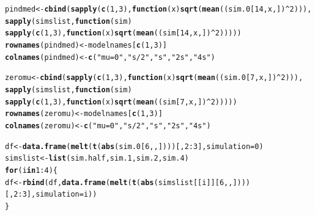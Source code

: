 \documentclass[AMA,STIX1COL]{WileyNJD-v2}\usepackage[]{graphicx}\usepackage[]{color}
\makeatletter
\newcommand{\hlnum}[1]{\textcolor[rgb]{0.686,0.059,0.569}{#1}}%
\newcommand{\hlstr}[1]{\textcolor[rgb]{0.192,0.494,0.8}{#1}}%
\newcommand{\hlopt}[1]{\textcolor[rgb]{0,0,0}{#1}}%
\newcommand{\hlstd}[1]{\textcolor[rgb]{0.345,0.345,0.345}{#1}}%
\newcommand{\hlkwa}[1]{\textcolor[rgb]{0.161,0.373,0.58}{\textbf{#1}}}%
\newcommand{\hlkwb}[1]{\textcolor[rgb]{0.69,0.353,0.396}{#1}}%
\newcommand{\hlkwc}[1]{\textcolor[rgb]{0.333,0.667,0.333}{#1}}%
\newcommand{\hlkwd}[1]{\textcolor[rgb]{0.737,0.353,0.396}{\textbf{#1}}}%
\newenvironment{kframe}{%
 \def\at@end@of@kframe{}%
 \ifinner\ifhmode%
  \def\at@end@of@kframe{\end{minipage}}%
  \begin{minipage}{\columnwidth}%
 \fi\fi%
 \def\FrameCommand##1{\hskip\@totalleftmargin \hskip-\fboxsep
 \colorbox{shadecolor}{##1}\hskip-\fboxsep
     \hskip-\linewidth \hskip-\@totalleftmargin \hskip\columnwidth}%
 \MakeFramed {\advance\hsize-\width
   \@totalleftmargin\z@ \linewidth\hsize
   \@setminipage}}%
 {\par\unskip\endMakeFramed%
 \at@end@of@kframe}
\newenvironment{knitrout}{}{} %
\makeatother
\begin{document}
\begin{knitrout}
\begin{kframe}
\begin{alltt}
\hlstd{pindmed}\hlkwb{<-} \hlkwd{cbind}\hlstd{(}\hlkwd{sapply}\hlstd{(}\hlkwd{c}\hlstd{(}\hlnum{1}\hlstd{,}\hlnum{3}\hlstd{),} \hlkwa{function}\hlstd{(}\hlkwc{x}\hlstd{)} \hlkwd{sqrt}\hlstd{(}\hlkwd{mean}\hlstd{((sim.0[}\hlnum{14}\hlstd{,x,])}\hlopt{^}\hlnum{2}\hlstd{))),}
                \hlkwd{sapply}\hlstd{(simslist,} \hlkwa{function}\hlstd{(}\hlkwc{sim}\hlstd{)}
                  \hlkwd{sapply}\hlstd{(}\hlkwd{c}\hlstd{(}\hlnum{1}\hlstd{,}\hlnum{3}\hlstd{),} \hlkwa{function}\hlstd{(}\hlkwc{x}\hlstd{)} \hlkwd{sqrt}\hlstd{(}\hlkwd{mean}\hlstd{((sim[}\hlnum{14}\hlstd{,x,])}\hlopt{^}\hlnum{2}\hlstd{)))))}
\hlkwd{rownames}\hlstd{(pindmed)}\hlkwb{<-}\hlstd{modelnames[}\hlkwd{c}\hlstd{(}\hlnum{1}\hlstd{,}\hlnum{3}\hlstd{)]}
\hlkwd{colnames}\hlstd{(pindmed)}\hlkwb{<-}\hlkwd{c}\hlstd{(}\hlstr{"mu=0"}\hlstd{,}\hlstr{"s/2"}\hlstd{,} \hlstr{"s"}\hlstd{,} \hlstr{"2s"}\hlstd{,} \hlstr{"4s"}\hlstd{)}

\hlstd{zeromu}\hlkwb{<-} \hlkwd{cbind}\hlstd{(}\hlkwd{sapply}\hlstd{(}\hlkwd{c}\hlstd{(}\hlnum{1}\hlstd{,}\hlnum{3}\hlstd{),} \hlkwa{function}\hlstd{(}\hlkwc{x}\hlstd{)} \hlkwd{sqrt}\hlstd{(}\hlkwd{mean}\hlstd{((sim.0[}\hlnum{7}\hlstd{,x,])}\hlopt{^}\hlnum{2}\hlstd{))),}
               \hlkwd{sapply}\hlstd{(simslist,} \hlkwa{function}\hlstd{(}\hlkwc{sim}\hlstd{)}
                 \hlkwd{sapply}\hlstd{(}\hlkwd{c}\hlstd{(}\hlnum{1}\hlstd{,}\hlnum{3}\hlstd{),} \hlkwa{function}\hlstd{(}\hlkwc{x}\hlstd{)} \hlkwd{sqrt}\hlstd{(}\hlkwd{mean}\hlstd{((sim[}\hlnum{7}\hlstd{,x,])}\hlopt{^}\hlnum{2}\hlstd{)))))}
\hlkwd{rownames}\hlstd{(zeromu)}\hlkwb{<-}\hlstd{modelnames[}\hlkwd{c}\hlstd{(}\hlnum{1}\hlstd{,}\hlnum{3}\hlstd{)]}
\hlkwd{colnames}\hlstd{(zeromu)}\hlkwb{<-}\hlkwd{c}\hlstd{(}\hlstr{"mu=0"}\hlstd{,}\hlstr{"s/2"}\hlstd{,} \hlstr{"s"}\hlstd{,} \hlstr{"2s"}\hlstd{,} \hlstr{"4s"}\hlstd{)}


\hlstd{df}\hlkwb{<-} \hlkwd{data.frame}\hlstd{(}\hlkwd{melt}\hlstd{(}\hlkwd{t}\hlstd{(}\hlkwd{abs}\hlstd{(sim.0[}\hlnum{6}\hlstd{,,])))[,}\hlnum{2}\hlopt{:}\hlnum{3}\hlstd{],} \hlkwc{simulation}\hlstd{=}\hlnum{0}\hlstd{)}
\hlstd{simslist}\hlkwb{<-}\hlkwd{list}\hlstd{(sim.half,sim.1,sim.2,sim.4)}
\hlkwa{for} \hlstd{(i} \hlkwa{in} \hlnum{1}\hlopt{:}\hlnum{4}\hlstd{)\{}
  \hlstd{df}\hlkwb{<-}\hlkwd{rbind}\hlstd{(df,}\hlkwd{data.frame}\hlstd{(}\hlkwd{melt}\hlstd{(}\hlkwd{t}\hlstd{(}\hlkwd{abs}\hlstd{(simslist[[i]][}\hlnum{6}\hlstd{,,])))[,}\hlnum{2}\hlopt{:}\hlnum{3}\hlstd{],} \hlkwc{simulation}\hlstd{=i))}
\hlstd{\}}


\end{alltt}
\end{kframe}
\end{knitrout}
\end{document}
